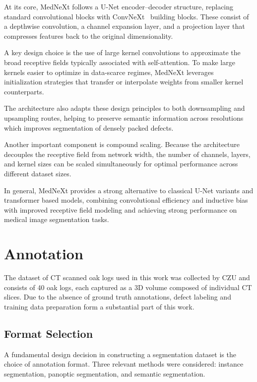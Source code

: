 At its core, MedNeXt follows a U-Net encoder–decoder structure, replacing standard convolutional blocks with ConvNeXt~\cite{woo2023convnextv2} building blocks. These consist of a depthwise convolution, a channel expansion layer, and a projection layer that compresses features back to the original dimensionality.

A key design choice is the use of large kernel convolutions to approximate the broad receptive fields typically associated with self-attention. To make large kernels easier to optimize in data-scarce regimes, MedNeXt leverages initialization strategies that transfer or interpolate weights from smaller kernel counterparts.

The architecture also adapts these design principles to both downsampling and upsampling routes, helping to preserve semantic information across resolutions which improves segmentation of densely packed defects.

Another important component is compound scaling. Because the architecture decouples the receptive field from network width, the number of channels, layers, and kernel sizes can be scaled simultaneously for optimal performance across different dataset sizes.

In general, MedNeXt provides a strong alternative to classical U-Net variants and transformer based models, combining convolutional efficiency and inductive bias with improved receptive field modeling and achieving strong performance on medical image segmentation tasks.


\chapter{Annotation}
\label{chap:dataset_annotation}
The dataset of CT scanned oak logs used in this work was collected by CZU and consists of 40 oak logs, each captured as a 3D volume composed of individual CT slices. Due to the absence of ground truth annotations, defect labeling and training data preparation form a substantial part of this work.

\section{Format Selection}

A fundamental design decision in constructing a segmentation dataset is the
choice of annotation format. Three relevant methods were considered: instance
segmentation, panoptic segmentation, and semantic segmentation.

